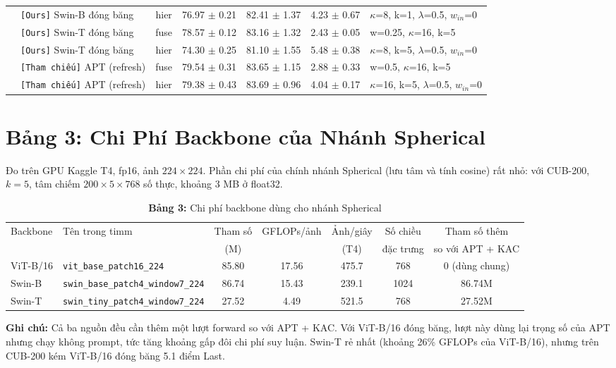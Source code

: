 \documentclass[10pt,a4paper]{article}
\newcommand{\src}[1]{\texttt{[#1]}}
\begin{document}
{\begin{longtable}{llcccc l}
 & \src{Ours} Swin-B đóng băng & hier & 76.97 $\pm$ 0.21 & 82.41 $\pm$ 1.37 & 4.23 $\pm$ 0.67 & {\scriptsize $\kappa$=8, k=1, $\lambda$=0.5, $w_{in}$=0} \\
\cmidrule(l){2-7}
 & \src{Ours} Swin-T đóng băng & fuse & 78.57 $\pm$ 0.12 & 83.16 $\pm$ 1.32 & 2.43 $\pm$ 0.05 & {\scriptsize w=0.25, $\kappa$=16, k=5} \\
 & \src{Ours} Swin-T đóng băng & hier & 74.30 $\pm$ 0.25 & 81.10 $\pm$ 1.55 & 5.48 $\pm$ 0.38 & {\scriptsize $\kappa$=8, k=5, $\lambda$=0.5, $w_{in}$=0} \\
\cmidrule(l){2-7}
 & \src{Tham chiếu} APT (refresh) & fuse & 79.54 $\pm$ 0.31 & 83.65 $\pm$ 1.15 & 2.88 $\pm$ 0.33 & {\scriptsize w=0.5, $\kappa$=16, k=5} \\
 & \src{Tham chiếu} APT (refresh) & hier & 79.38 $\pm$ 0.43 & 83.69 $\pm$ 0.96 & 4.04 $\pm$ 0.17 & {\scriptsize $\kappa$=16, k=5, $\lambda$=0.5, $w_{in}$=0} \\
\end{longtable}
}

\section{Bảng 3: Chi Phí Backbone của Nhánh Spherical}
Đo trên GPU Kaggle T4, fp16, ảnh $224\times224$. Phần chi phí của chính nhánh Spherical (lưu tâm và tính cosine) rất nhỏ: với CUB-200, $k=5$, tâm chiếm $200\times5\times768$ số thực, khoảng 3 MB ở float32.

\begin{table}[h]
\centering\footnotesize\setlength{\tabcolsep}{4pt}
\caption{\textbf{Bảng 3:} Chi phí backbone dùng cho nhánh Spherical}
\begin{tabular}{llccccc}
\toprule
Backbone & Tên trong timm & Tham số & GFLOPs/ảnh & Ảnh/giây & Số chiều & Tham số thêm \\
 & & (M) & & (T4) & đặc trưng & so với APT + KAC \\
\midrule
ViT-B/16 & \texttt{vit\_base\_patch16\_224} & 85.80 & 17.56 & 475.7 & 768 & 0 (dùng chung) \\
Swin-B & \texttt{swin\_base\_patch4\_window7\_224} & 86.74 & 15.43 & 239.1 & 1024 & 86.74M \\
Swin-T & \texttt{swin\_tiny\_patch4\_window7\_224} & 27.52 & 4.49 & 521.5 & 768 & 27.52M \\
\bottomrule
\end{tabular}
\end{table}

\textbf{Ghi chú:} Cả ba nguồn đều cần thêm một lượt forward so với APT + KAC. Với ViT-B/16 đóng băng, lượt này dùng lại trọng số của APT nhưng chạy không prompt, tức tăng khoảng gấp đôi chi phí suy luận. Swin-T rẻ nhất (khoảng 26\% GFLOPs của ViT-B/16), nhưng trên CUB-200 kém ViT-B/16 đóng băng 5.1 điểm Last.
\end{document}
